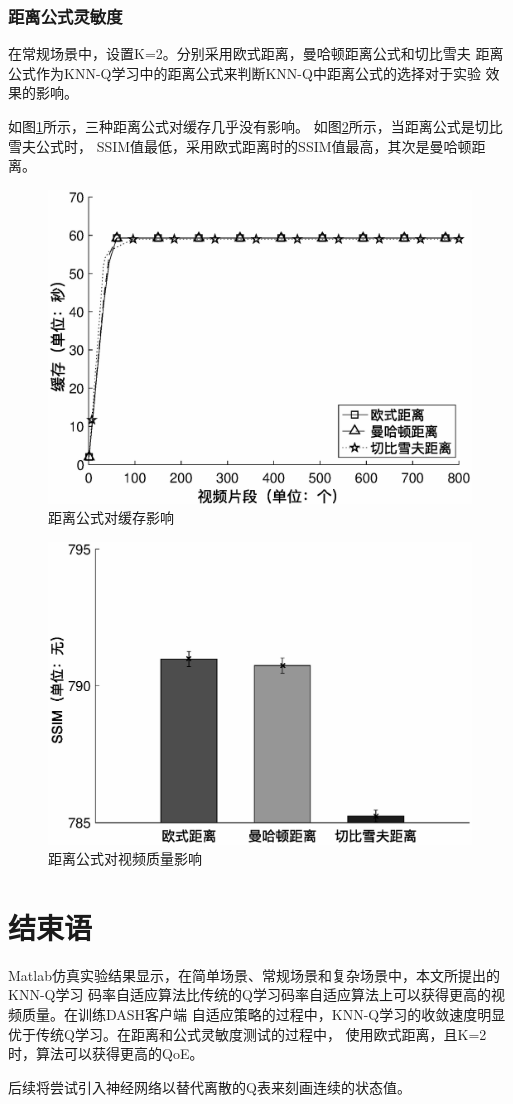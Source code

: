 \documentclass[twocolumn]{article}
\begin{document}
\subsubsection{距离公式灵敏度}
在常规场景中，设置K=2。分别采用欧式距离，曼哈顿距离公式和切比雪夫
距离公式作为KNN-Q学习中的距离公式来判断KNN-Q中距离公式的选择对于实验
效果的影响。

如图\ref{distance_buffer}所示，三种距离公式对缓存几乎没有影响。
如图\ref{distance_ssim}所示，当距离公式是切比雪夫公式时，
SSIM值最低，采用欧式距离时的SSIM值最高，其次是曼哈顿距离。

\begin{figure}[htbp]
\centering
\includegraphics[width=\columnwidth]{distance_buffer}
\caption{距离公式对缓存影响}
\label{distance_buffer}
\end{figure}
\begin{figure}[htbp]
\centering
\includegraphics[width=\columnwidth]{distance_ssim}
\caption{距离公式对视频质量影响}
\label{distance_ssim}
\end{figure}
\section{结束语}
Matlab仿真实验结果显示，在简单场景、常规场景和复杂场景中，本文所提出的KNN-Q学习
码率自适应算法比传统的Q学习码率自适应算法上可以获得更高的视频质量。在训练DASH客户端
自适应策略的过程中，KNN-Q学习的收敛速度明显优于传统Q学习。在距离和公式灵敏度测试的过程中，
使用欧式距离，且K=2时，算法可以获得更高的QoE。

后续将尝试引入神经网络以替代离散的Q表来刻画连续的状态值。


\bigskip
\end{document}
